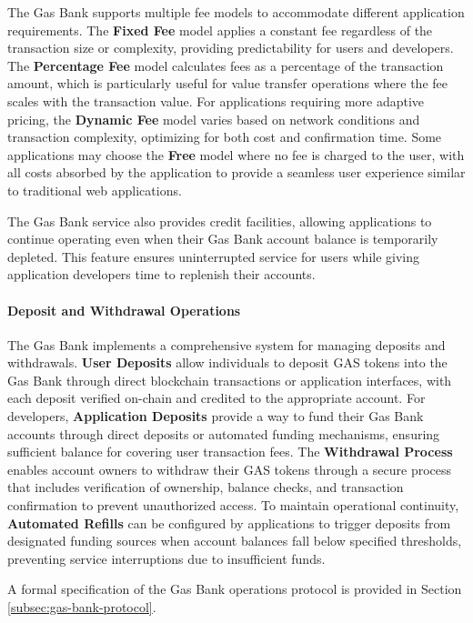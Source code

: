 \documentclass{article}
\begin{document}
The Gas Bank supports multiple fee models to accommodate different application requirements. The \textbf{Fixed Fee} model applies a constant fee regardless of the transaction size or complexity, providing predictability for users and developers. The \textbf{Percentage Fee} model calculates fees as a percentage of the transaction amount, which is particularly useful for value transfer operations where the fee scales with the transaction value. For applications requiring more adaptive pricing, the \textbf{Dynamic Fee} model varies based on network conditions and transaction complexity, optimizing for both cost and confirmation time. Some applications may choose the \textbf{Free} model where no fee is charged to the user, with all costs absorbed by the application to provide a seamless user experience similar to traditional web applications.

The Gas Bank service also provides credit facilities, allowing applications to continue operating even when their Gas Bank account balance is temporarily depleted. This feature ensures uninterrupted service for users while giving application developers time to replenish their accounts.



\paragraph{Deposit and Withdrawal Operations}
The Gas Bank implements a comprehensive system for managing deposits and withdrawals. \textbf{User Deposits} allow individuals to deposit GAS tokens into the Gas Bank through direct blockchain transactions or application interfaces, with each deposit verified on-chain and credited to the appropriate account. For developers, \textbf{Application Deposits} provide a way to fund their Gas Bank accounts through direct deposits or automated funding mechanisms, ensuring sufficient balance for covering user transaction fees. The \textbf{Withdrawal Process} enables account owners to withdraw their GAS tokens through a secure process that includes verification of ownership, balance checks, and transaction confirmation to prevent unauthorized access. To maintain operational continuity, \textbf{Automated Refills} can be configured by applications to trigger deposits from designated funding sources when account balances fall below specified thresholds, preventing service interruptions due to insufficient funds.

A formal specification of the Gas Bank operations protocol is provided in Section \ref{subsec:gas-bank-protocol}.
\end{document}
